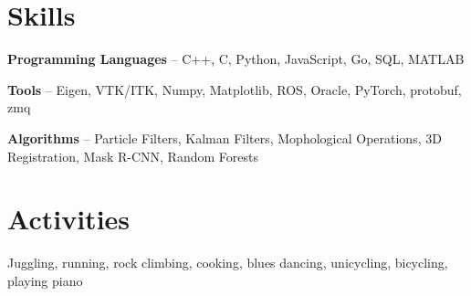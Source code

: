 \documentclass[letterpaper,11pt]{article}
\newcommand{\resumeSubHeadingListStart}{}
\newcommand{\resumeSubHeadingListEnd}{}
\begin{document}
\section{Skills}
  \resumeSubHeadingListStart
    \item \textbf{Programming Languages} -- C++, C, Python, JavaScript, Go, SQL, MATLAB
    \item \textbf{Tools} -- Eigen, VTK/ITK, Numpy, Matplotlib, ROS, Oracle, PyTorch, protobuf, zmq
    \item \textbf{Algorithms} -- Particle Filters, Kalman Filters, Mophological Operations, 3D Registration, Mask R-CNN, Random Forests
  \resumeSubHeadingListEnd
\section{Activities}
    \resumeSubHeadingListStart
    \item Juggling, running, rock climbing, cooking, blues dancing, unicycling, bicycling, playing piano
  \resumeSubHeadingListEnd
\end{document}
